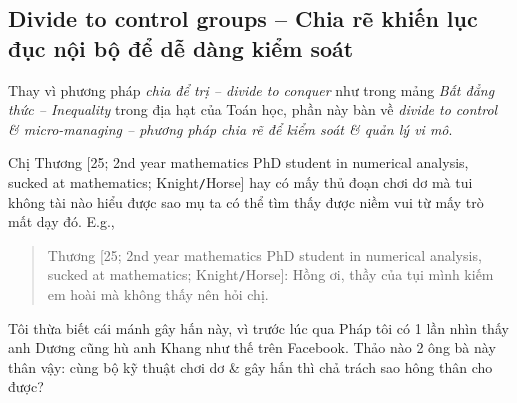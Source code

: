 \documentclass[12pt,twoside]{book}
\begin{document}
\subsection{Divide to control groups -- Chia rẽ khiến lục đục nội bộ để dễ dàng kiểm soát}
Thay vì phương pháp {\it chia để trị -- divide to conquer} như trong mảng {\it Bất đẳng thức -- Inequality} trong địa hạt của Toán học, phần này bàn về {\it divide to control \& micro-managing -- phương pháp chia rẽ để kiểm soát \& quản lý vi mô}.

Chị {\sf Thương [25; 2nd year mathematics PhD student in numerical analysis, sucked at mathematics; Knight{\tt/}Horse]} hay có mấy thủ đoạn chơi dơ mà tui không tài nào hiểu được sao mụ ta có thể tìm thấy được niềm vui từ mấy trò mất dạy đó. E.g.,
\begin{quote}
	{\sf Thương [25; 2nd year mathematics PhD student in numerical analysis, sucked at mathematics; Knight{\tt/}Horse]}: Hồng ơi, thầy của tụi mình kiếm em hoài mà không thấy nên hỏi chị.
\end{quote}
Tôi thừa biết cái mánh gây hấn này, vì trước lúc qua Pháp tôi có 1 lần nhìn thấy anh {\sf Dương} cũng hù anh {\sf Khang} như thế trên Facebook. Thảo nào 2 ông bà này thân vậy: cùng bộ kỹ thuật chơi dơ \& gây hấn thì chả trách sao hông thân cho được?
\end{document}
